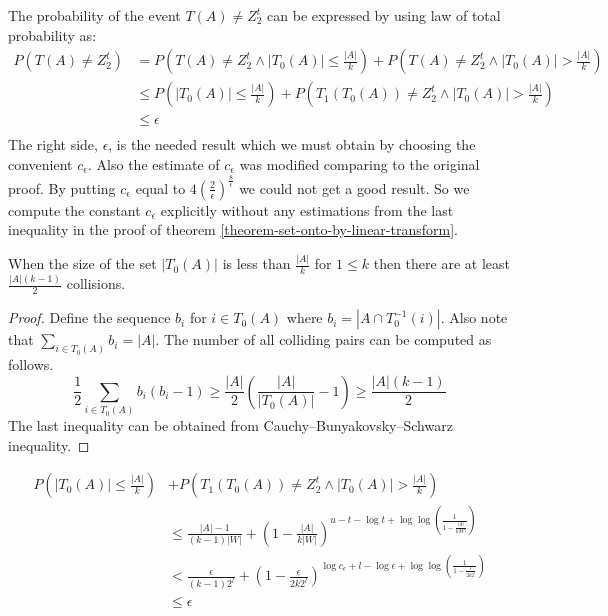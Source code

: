 The probability of the event $T(A) \neq Z_2^t$ can be expressed by using law of total probability as:
\begin{displaymath}
\begin{split}
P(T(A) \neq Z_2^t) 
    & = P(T(A) \neq Z_2^t \wedge |T_0(A)| \leq \frac{|A|}{k}) + P(T(A) \neq Z_2^t \wedge |T_0(A)| > \frac{|A|}{k}) \\ 
    & \leq P(|T_0(A)| \leq \frac{|A|}{k}) + P(T_1(T_0(A)) \neq Z_2^t \wedge |T_0(A)| > \frac{|A|}{k}) \\
    & \leq \epsilon \\
\end{split}
\end{displaymath}
The right side, $\epsilon$, is the needed result which we must obtain by choosing the convenient $c_{\epsilon}$. Also the estimate of $c_{\epsilon}$ was modified comparing to the original proof. By putting $c_{\epsilon}$ equal to $4\left(\frac{2}{\epsilon}\right)^{\frac{8}{\epsilon}}$ we could not get a good result. So we compute the constant $c_{\epsilon}$ explicitly without any estimations from the last inequality in the proof of theorem \ref{theorem-set-onto-by-linear-transform}.

\begin{lemma}
\label{lemma-collision-count}
When the size of the set $|T_0(A)|$ is less than $\frac{|A|}{k}$ for $1 \leq k$ then there are at least $\frac{|A|(k - 1)}{2}$ collisions.
\end{lemma} 
\begin{proof}
Define the sequence $b_i$ for $i \in T_0(A)$ where $b_i = \left|A \cap T_0^{-1}(i)\right|$. Also note that $\sum_{i \in T_0(A)} b_i = |A|$.
The number of all colliding pairs can be computed as follows.
\begin{displaymath}
\frac{1}{2} \sum_{i \in T_0(A)} b_i (b_i - 1) \geq \frac{|A|}{2}\left(\frac{|A|}{|T_0(A)|} - 1\right) \geq \frac{|A|(k - 1)}{2}
\end{displaymath}
The last inequality can be obtained from Cauchy–Bunyakovsky–Schwarz inequality.
\end{proof}

\begin{displaymath}
\begin{split}
P(|T_0(A)| \leq \frac{|A|}{k}) & + P(T_1(T_0(A)) \neq Z_2^t \wedge |T_0(A)| > \frac{|A|}{k}) \\ 
& \leq \frac{|A| - 1}{(k - 1)|W|} + \left(1 - \frac{|A|}{k|W|}\right)^{u - t - \log t + \log \log \left(\frac{1}{1 - \frac{|A|}{k|W|}}\right)} \\
& < \frac{\epsilon}{(k - 1) 2 ^ l} + \left(1 - \frac{\epsilon}{2 k 2^l}\right)^{\log c_\epsilon + l - \log \epsilon + \log \log \left(\frac{1}{1 - \frac{\epsilon}{2 k 2^l}}\right)} \\
& \leq \epsilon \\
\end{split}
\end{displaymath}

